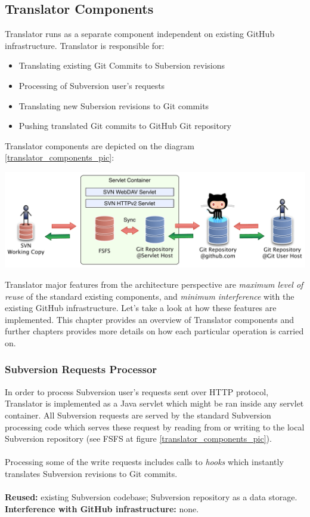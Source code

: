 \subsection{Translator Components}
\renewcommand{\figurename}{Figure}

Translator runs as a separate component independent on existing GitHub infrastructure. Translator is responsible for:
\begin{itemize}
  \item Translating existing Git Commits to Subersion revisions
  \item Processing of Subversion user's requests
  \item Translating new Subersion revisions to Git commits
  \item Pushing translated Git commits to GitHub Git repository
\end{itemize}
Translator components are depicted on the diagram \ref{translator_components_pic}:
\begin{center}
\includegraphics[width=\textwidth]{img/servlet/components_keep_github_safe.pdf}%
\label{translator_components_pic}%
\end{center}

Translator major features from the architecture perspective are \emph{maximum level of reuse} of the standard existing components, and \emph{minimum interference} with the existing GitHub infrastructure. 
Let's take a look at how these features are implemented. This chapter provides an overview of Translator components and further chapters provides more details on how each particular operation is carried on.

\label{srp}
\subsubsection{Subversion Requests Processor}
In order to process Subversion user's requests sent over HTTP protocol, Translator is implemented as a Java servlet which might be ran inside any servlet container. All Subversion requests are served by the standard Subversion processing code which serves 
these request by reading from or writing to the local Subversion repository (see FSFS at figure \ref{translator_components_pic}).
\\\\
Processing some of the write requests includes calls to \emph{hooks} which instantly translates Subversion revisions to Git commits.
\\\\
\textbf{Reused:} existing Subversion codebase; Subversion repository as a data storage.\\
\textbf{Interference with GitHub infrastructure:} none. 

